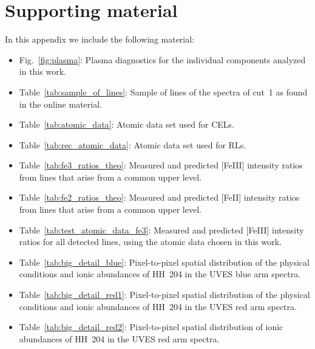 \documentclass[twocolumn,linenumbers]{aastex63}
\begin{document}
\section{Supporting material}
\label{sec:sup_mat}

In this appendix we include the following material:


\begin{itemize}
    \item Fig.~\ref{fig:plasma}: Plasma diagnostics for the individual components analyzed in this work.
    
    \item Table~\ref{tab:sample_of_lines}: Sample of lines of the spectra of cut~1 as found in the online material.

    \item Table~\ref{tab:atomic_data}: Atomic data set used for CELs.
    
    \item Table~\ref{tab:rec_atomic_data}: Atomic data set used for RLs.
    
    \item Table~\ref{tab:fe3_ratios_theo}: Measured and predicted
    [Fe\thinspace III] intensity ratios from lines that arise from a common upper level. 
    
    \item Table~\ref{tab:fe2_ratios_theo}: Measured and predicted [Fe\thinspace II] intensity ratios from lines that arise from a common upper level. 
    
    \item Table~\ref{tab:test_atomic_data_fe3}: Measured and predicted [Fe\thinspace III] intensity ratios for all detected lines, using the atomic data chosen in this work.
    
    \item Table~\ref{tab:big_detail_blue}: Pixel-to-pixel spatial distribution of the physical conditions and ionic abundances of HH~204 in the UVES blue arm spectra.
    
    \item Table~\ref{tab:big_detail_red1}: Pixel-to-pixel spatial distribution of the physical conditions and ionic abundances of HH~204 in the UVES red arm spectra.

    \item Table~\ref{tab:big_detail_red2}: Pixel-to-pixel spatial distribution of ionic abundances of HH~204 in the UVES red arm spectra.

\end{itemize}
\end{document}
